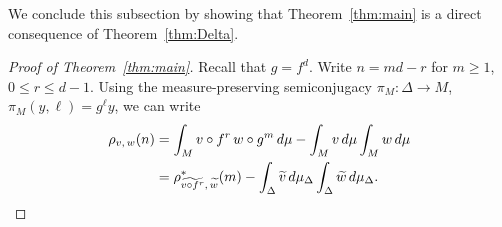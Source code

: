 \documentclass[10pt]{amsart}
\theoremstyle{definition}\newtheorem{defi}[theo]{Definition}\newtheorem{rema}[theo]{Remark}\newtheorem{exam}[theo]{Example}\newtheorem{exem}[theo]{Example}\newtheorem{nota}[theo]{Notation}
\newcommand{\tw}{\widetilde{w}}
\newcommand{\tv}{\tilde{v}}
\let\oldtilde\tilde
\renewcommand*{\tilde}[1]{\mathchoice{\widetilde{#1}}{\widetilde{#1}}{\oldtilde{#1}}{\oldtilde{#1}}}
\begin{document}
We conclude this subsection by showing that Theorem~\ref{thm:main} is a direct consequence of Theorem~\ref{thm:Delta}.

\begin{proof}[Proof of Theorem~\ref{thm:main}]
Recall that $g=f^d$. Write $n=md-r$ for $m\ge1$, $0\le r\le d-1$. Using the measure-preserving semiconjugacy $\pi_M:\Delta\to M$, $\pi_M(y,\ell)=g^\ell y$, we can write
\begin{equation}\label{eq:main}
\begin{aligned}
\rho_{v,\,w}(n) & =\int_M v\circ f^r\,w\circ g^m\,d\mu-\int_M v\,d\mu\int_M w\,d\mu\\
& =\rho^*_{\widetilde{v\circ f^r},\,\tw}(m)-\int_\Delta \tv\,d\mu_\Delta\int_\Delta \tw\,d\mu_\Delta.
\end{aligned}
\end{equation}


\end{proof}
\end{document}
